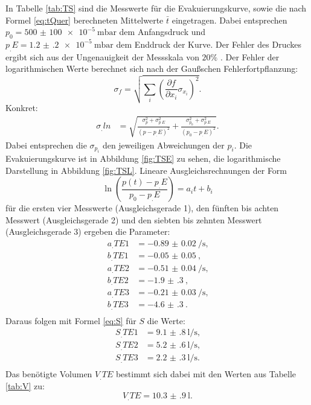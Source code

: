 In Tabelle \ref{tab:TS} sind die Messwerte für die Evakuierungskurve, sowie die nach Formel \eqref{eq:tQuer} berechneten Mittelwerte $\bar{t}$ eingetragen.
Dabei entsprechen $p_0=\SI{500(100)e-5}{\milli\bar}$ dem Anfangsdruck und $p_.E=\SI{1.2(2)e-5}{\milli\bar}$ dem Enddruck der Kurve. Der Fehler des Druckes ergibt sich aus der Ungenauigkeit der Messskala von $20\%$ \cite{V70}. 
Der Fehler der logarithmischen Werte berechnet sich nach der Gaußschen Fehlerfortpflanzung:
\[
\sigma_f = \sqrt{\sum_i\left(\frac{\partial f}{\partial x_i}\sigma_{x_i}\right)^2}\text{.}
\]
Konkret:
\begin{align}
\sigma_.{ln}	&=\sqrt{\frac{\sigma_p^2+\sigma_{p_.E}^2}{(p-p_.E)^2}+\frac{\sigma_{p_0}^2+\sigma_{p_.E}^2}{(p_0-p_.E)^2}}\text{.} \label{eq:ln}
\end{align}
Dabei entsprechen die $\sigma_{p_i}$ den jeweiligen Abweichungen der $p_i$.
Die Evakuierungskurve ist in Abbildung \ref{fig:TSE} zu sehen, die logarithmische Darstellung in Abbildung \ref{fig:TSL}.
Lineare Ausgleichsrechnungen der Form
\[
\ln\left(\frac{p(t)-p_.E}{p_0-p_.E}\right) = a_it+b_i
\]
für die ersten vier Messwerte (Ausgleichsgerade 1), den fünften bis achten Messwert (Ausgleichsgerade 2) und den siebten bis zehnten Messwert (Ausgleichsgerade 3) ergeben die Parameter:
\begin{align*}
a_.{TE1} &= \SI{-0.89(2)}{\per\second} \text{,}\\
b_.{TE1} &= \SI{-0.05(5)}{} \text{,}\\
a_.{TE2} &= \SI{-0.51(4)}{\per\second} \text{,}\\
b_.{TE2} &= \SI{-1.9(3)}{} \text{,}\\
a_.{TE3} &= \SI{-0.21(3)}{\per\second} \text{,}\\
b_.{TE3} &= \SI{-4.6(3)}{} \text{.}\\
\end{align*} 
Daraus folgen mit Formel \eqref{eq:S} für $S$ die Werte:
\begin{align*}
S_.{TE1} &= \SI{9.1(8)}{\litre\per\second} \text{,}\\
S_.{TE2} &= \SI{5.2(6)}{\litre\per\second} \text{,}\\
S_.{TE3} &= \SI{2.2(3)}{\litre\per\second} \text{.}\\
\end{align*} 
Das benötigte Volumen $V_.{TE}$ bestimmt sich dabei mit den Werten aus Tabelle \ref{tab:V} zu:
\[
V_.{TE} = \SI{10.3(9)}{\litre}\text{.}
\]

